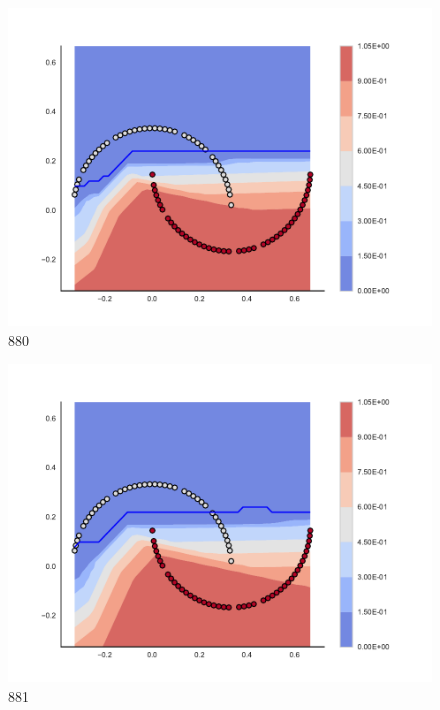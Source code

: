 \begin{subfigure}[b]{0.09\textwidth}
    \includegraphics[clip, trim=2.35cm 1.75cm 4.5cm 0cm,width=\textwidth]{img/convergence/880.pdf}
    \caption{880}
    \label{fig:convergence_880}
\end{subfigure}
%
\begin{subfigure}[b]{0.09\textwidth}
    \includegraphics[clip, trim=2.35cm 1.75cm 4.5cm 0cm,width=\textwidth]{img/convergence/881.pdf}
    \caption{881}
    \label{fig:convergence_881}
\end{subfigure}
%
